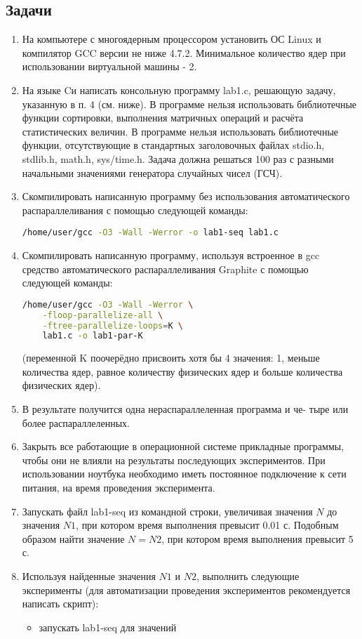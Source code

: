 \documentclass[14pt, a4paper, oneside, final]{extarticle}
\begin{document}
\subsection*{Задачи}
\begin{enumerate}
 \item На компьютере с многоядерным процессором установить ОС Linux и компилятор GCC версии не ниже 4.7.2.
 Минимальное количество ядер при использовании виртуальной машины - 2.
 \item На языке Cи написать консольную программу lab1.c, решающую
задачу, указанную в п. 4 (см. ниже). В программе нельзя использовать библиотечные функции сортировки, выполнения матричных операций и расчёта статистических величин. В программе нельзя использовать библиотечные функции, отсутствующие в стандартных заголовочных файлах stdio.h, stdlib.h, math.h, sys/time.h. Задача должна решаться 100 раз с разными начальными значениями генератора случайных чисел (ГСЧ).
 \item Скомпилировать написанную программу без использования автоматического распараллеливания с помощью следующей команды:

\lstinline[language=Bash]{/home/user/gcc -O3 -Wall -Werror -o lab1-seq lab1.c}
 \item Скомпилировать написанную программу, используя встроенное в gcc средство автоматического распараллеливания Graphite с помощью следующей команды:

 \begin{lstlisting}[language=Bash]
 /home/user/gcc -O3 -Wall -Werror \
    -floop-parallelize-all \
    -ftree-parallelize-loops=K \
    lab1.c -o lab1-par-K
 \end{lstlisting}
 (переменной K поочерёдно присвоить хотя бы 4 значения: 1, меньше количества ядер, равное количеству физических ядер и больше количества физических ядер).
 \item В результате получится одна нераспараллеленная программа и че-
тыре или более распараллеленных.
 \item Закрыть все работающие в операционной системе прикладные программы, чтобы они не влияли на результаты последующих экспериментов. При использовании ноутбука необходимо иметь постоянное подключение к сети питания, на время проведения эксперимента.
 \item Запускать файл lab1-seq из командной строки, увеличивая значения $N$ до значения $N1$, при котором время выполнения превысит 0.01 с. Подобным образом найти значение $N=N2$, при котором время выполнения превысит 5 с.
 \item Используя найденные значения $N1$ и $N2$, выполнить следующие эксперименты (для автоматизации проведения экспериментов рекомендуется написать скрипт):
    \begin{itemize}
        \item запускать lab1-seq для значений


\end{itemize}
\end{enumerate}
\end{document}
